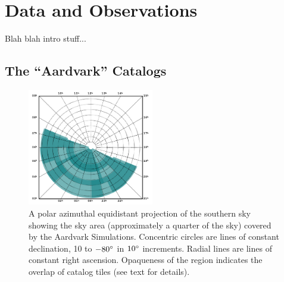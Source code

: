 \documentclass[apj, revtex4]{emulateapj}
\begin{document}

\section{Data and Observations}

Blah blah intro stuff... 

\subsection{The ``Aardvark'' Catalogs}
\begin{figure} 
	\includegraphics[width=0.49\textwidth]{surveyArea.pdf} 
	\caption{A polar azimuthal equidistant projection of the southern sky showing the sky area (approximately a quarter of the sky) covered by the Aardvark Simulations. Concentric circles are lines of constant declination, 10 to $-80\hbox{$^\circ$}$ in $10\hbox{$^\circ$}$ increments. Radial lines are lines of constant right ascension. Opaqueness of the region indicates the overlap of catalog tiles (see text for details).} 
	\label{fig:survey area} 
\end{figure}
\end{document}
